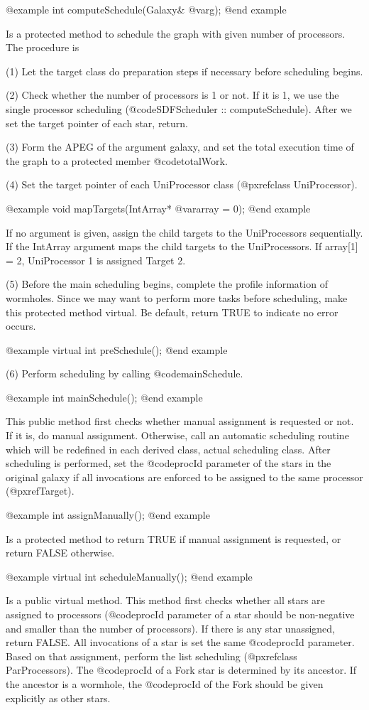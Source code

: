@example
int computeSchedule(Galaxy& @var{g});
@end example

Is a protected method to schedule the graph with given number of processors.
The procedure is

(1) Let the target class do preparation steps if necessary before scheduling
begins.

(2) Check whether the number of processors is 1 or not. If it is 1, we use
the single processor scheduling (@code{SDFScheduler :: computeSchedule}).
After we set the target pointer of each star, return.

(3) Form the APEG of the argument galaxy, and set the total execution time
of the graph to a protected member @code{totalWork}.

(4) Set the target pointer of each UniProcessor class
(@pxref{class UniProcessor}).

@example
void mapTargets(IntArray* @var{array} = 0);
@end example

If no argument is given, assign the child targets to the UniProcessors
sequentially. If the IntArray argument maps the child targets to the
UniProcessors. If array[1] = 2, UniProcessor 1 is assigned Target 2.

(5) Before the main scheduling begins, complete the profile information of
wormholes. Since we may want to perform more tasks before scheduling, make
this protected method virtual. Be default, return TRUE to indicate no error
occurs.

@example
virtual int preSchedule();
@end example

(6) Perform scheduling by calling @code{mainSchedule}.

@example 
int mainSchedule();
@end example

This public method first checks whether manual assignment is requested or not.
If it is, do manual assignment. Otherwise, call an automatic scheduling 
routine which will be redefined in each derived class, actual scheduling
class. After scheduling is performed, set the @code{procId} parameter of
the stars in the original galaxy if all invocations are enforced to be
assigned to the same processor (@pxref{Target}).

@example
int assignManually();
@end example

Is a protected method to return TRUE if manual assignment is requested, or
return FALSE otherwise.

@example
virtual int scheduleManually();
@end example

Is a public virtual method. This method first checks whether all stars
are assigned to processors (@code{procId} parameter of a star should be
non-negative and smaller than the number of processors). If there is any
star unassigned, return FALSE. All invocations of a star is set the same
@code{procId} parameter. Based on that assignment, perform the
list scheduling (@pxref{class ParProcessors}). The @code{procId} of a Fork
star is determined by its ancestor. If the ancestor is a wormhole, the
@code{procId} of the Fork should be given explicitly as other stars.

